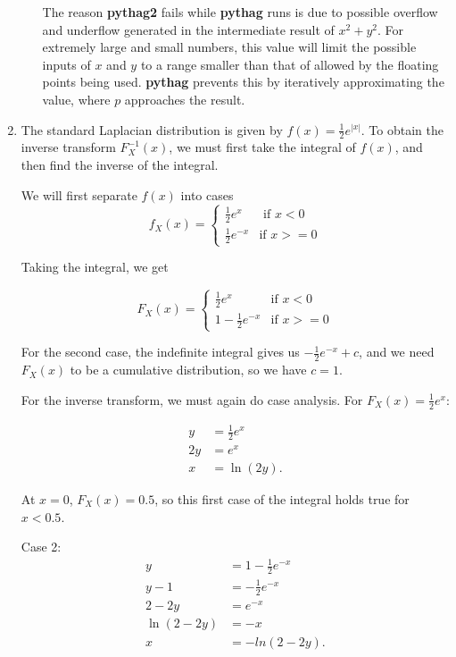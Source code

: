 \documentclass{amsart}
\theoremstyle{definition}
\theoremstyle{remark}
\begin{document}
\begin{enumerate}
\begin{enumerate}
The reason \textbf{pythag2} fails while \textbf{pythag} runs is due to possible overflow and underflow generated in the intermediate result of $x^2+y^2$. For extremely large and small numbers, this value will limit the possible inputs of $x$ and $y$ to a range smaller than that of allowed by the floating points being used. \textbf{pythag} prevents this by iteratively approximating the value, where $p$ approaches the result. 
\\
\end{enumerate}
\item
The standard Laplacian distribution is given by $f(x)  = \frac{1}{2} e ^{|x|}$. 
\newline
To obtain the inverse transform $F^{-1}_X(x)$, we must first take the integral of $f(x)$, and then find the inverse of the integral. 

We will first separate $f(x)$ into cases
$$f_X(x) = \begin{cases}
    \frac{1}{2}e^{x} & \text{     if $x < 0$} \\
    \frac{1}{2}e^{-x} & \text{if $x >= 0$}
    \end{cases}
$$

Taking the integral, we get

$$F_X(x) = \begin{cases}
    \frac{1}{2}e^{x} & \text{if $x < 0$} \\
    1 - \frac{1}{2}e^{-x} & \text{if $x >= 0$}
    \end{cases}
$$

For the second case, the indefinite integral gives us $- \frac{1}{2}e^{-x} + c$, and we need $F_X(x)$ to be a cumulative distribution, so we have $c = 1$. 

For the inverse transform, we must again do case analysis. For $F_X(x) = \frac{1}{2}e^{x}$: 

\begin{align*}
y &= \frac{1}{2}e^{x}\\
2y &= e^{x}\\
x &= \ln (2y).
\end{align*}

At $x = 0$, $F_X(x) = 0.5$, so this first case of the integral holds true for $x < 0.5$. 

Case 2: 
\begin{align*}
y &= 1 - \frac{1}{2}e^{-x}\\
y - 1 &= - \frac{1}{2} e^{-x}\\
2 - 2y &= e^{-x}\\
\ln{(2-2y)} &= -x\\
x &= -ln{(2-2y)}.
\end{align*}


\end{enumerate}
\end{document}
